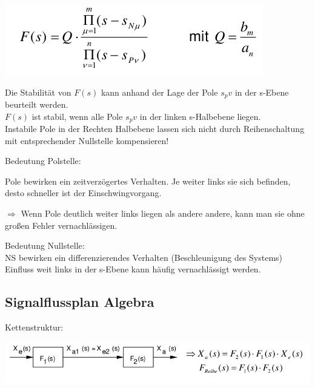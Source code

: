 \documentclass[10pt,a4paper]{article}
\begin{document}
\begin{center}
	\includegraphics[width=0.96\columnwidth]{Figures/PolNullstellenQ.png}
\end{center}

\begin{mdframed}[style=exercise]
	Die Stabilität von $F(s)$ kann anhand der Lage der Pole $s_pv$ in der s-Ebene
	beurteilt werden.\\ $F(s)$ ist stabil, wenn alle Pole $s_pv$ in der linken
	s-Halbebene liegen.\\ Instabile Pole in der Rechten Halbebene lassen sich
	nicht durch Reihenschaltung mit entsprechender Nullstelle kompensieren!
\end{mdframed}
\begin{mdframed}[style=exercise]
	Bedeutung Polstelle:

	Pole bewirken ein zeitverzögertes Verhalten. Je weiter links sie sich befinden,
	desto schneller ist der Einschwingvorgang.

	$\Rightarrow$ Wenn Pole deutlich weiter links liegen als andere andere, kann man sie ohne
	großen Fehler vernachlässigen.
\end{mdframed}
\begin{mdframed}[style=exercise]
	Bedeutung Nullstelle:\\
	NS bewirken ein differenzierendes Verhalten (Beschleunigung des Systems)
	Einfluss weit links in der s-Ebene kann häufig vernachlässigt werden.

\end{mdframed}

\subsection{Signalflussplan Algebra}

Kettenstruktur:
\begin{center}
	\includegraphics[width=0.96\columnwidth]{Figures/Kettenstruktur.png}
\end{center}
\end{document}
